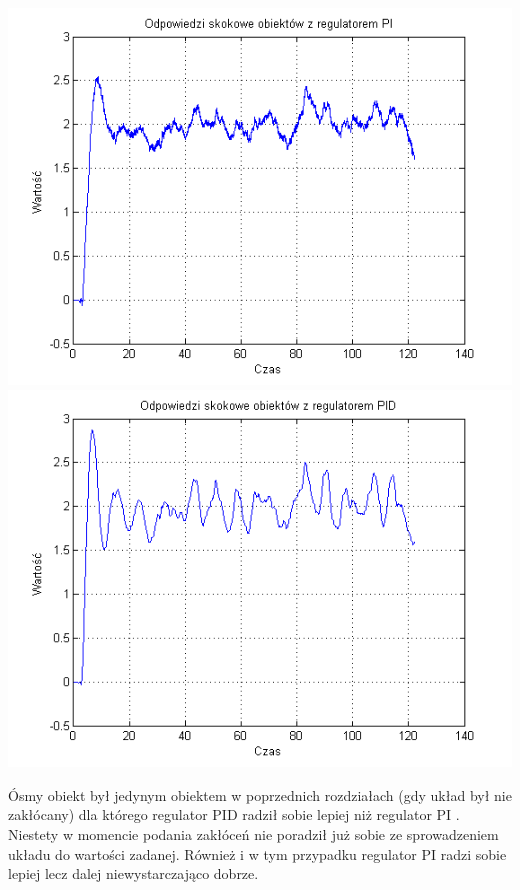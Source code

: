 \documentclass[10pt,a4paper]{article}
\begin{document}
\includegraphics[scale=1]{images/trzy/skrypt_18.png}\\
\includegraphics[scale=1]{images/cztery/skrypt_18.png}\\
\newpage

Ósmy obiekt był jedynym obiektem w poprzednich rozdziałach (gdy układ był nie zakłócany) dla którego regulator PID radził sobie lepiej niż regulator PI . Niestety w momencie podania zakłóceń nie poradził już sobie ze sprowadzeniem układu do wartości zadanej. Również i w tym przypadku regulator PI radzi sobie lepiej lecz dalej niewystarczająco dobrze.
\newpage
\end{document}
